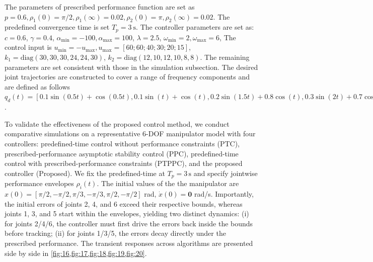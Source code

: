 \documentclass[pdflatex,sn-mathphys-num]{sn-jnl}%
\theoremstyle{thmstyleone}%
\theoremstyle{thmstyletwo}%
\theoremstyle{thmstylethree}%
\begin{document}
The parameters of prescribed performance function are set as $p=0.6, \rho_1(0)=\pi/2, \rho_1(\infty )=0.02,\rho_2(0)=\pi, \rho_2(\infty )=0.02$. The predefined convergence time is set $T_p = 3\ \mathrm{s}$.
The controller parameters are set as: $c=0.6$, $\gamma=0.4$, $\alpha_{\min}=-100, \alpha_{\max}=100$, $\lambda=2.5$, $\omega_{\min}=2, \omega_{\max}=6$, The control input is $u_{\min}=-u_{\max}, u_{\max}=[60; 60; 40; 30; 20; 15]$, $k_1=\mathrm{diag}( 30, 30, 30, 24, 24, 30) $, $k_2=\mathrm{diag}(12, 10, 12, 10, 8, 8)$. The remaining parameters are set consistent with those in the simulation subsection.
The desired joint trajectories are constructed to cover a range of frequency components and are defined as follows
$q_d(t)=[
			0.1\sin(0.5t) + \cos(0.5t),    
			0.1\sin(t) + \cos(t),          
			0.2\sin(1.5t) + 0.8\cos(t) ,   
			0.3\sin(2t) + 0.7\cos(0.5t),  
			0.1\sin(0.3t) + 0.9\cos(0.2t),
			0.4\sin(t) + 0.6\cos(2t)    
		]
$.


To validate the effectiveness of the proposed control method, we conduct comparative simulations on a representative 6-DOF manipulator model with four controllers: predefined-time control without performance constraints (PTC), prescribed-performance asymptotic stability control (PPC), predefined-time control with prescribed-performance constraints (PTPPC), and the proposed controller (Proposed). We fix the predefined-time at $T_p=3\,\mathrm{s}$ and specify jointwise performance envelopes $\rho_i(t)$. The initial values of the the manipulator are ${x}(0)=[{\pi}/{2}, -{\pi}/{2},{\pi}/{3}, -{\pi}/{3},{\pi}/{2},-{\pi}/{2}]$ rad, $\dot{x}(0)=\mathbf{0}$ rad/s. Importantly, the initial errors of joints 2, 4, and 6 exceed their respective bounds, whereas joints 1, 3, and 5 start within the envelopes, yielding two distinct dynamics: (i) for joints 2/4/6, the controller must first drive the errors back inside the bounds before tracking; (ii) for joints 1/3/5, the errors decay directly under the prescribed performance. The transient responses across algorithms are presented side by side in \cref{fig:16,fig:17,fig:18,fig:19,fig:20}.
\end{document}
